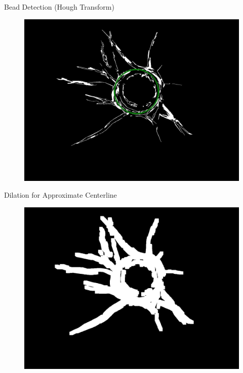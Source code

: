 \documentclass{beamer}
\begin{document}
\begin{frame}{Bead Detection (Hough Transform)}
	\begin{figure}
		\centering
		\includegraphics[width=\textwidth]{images/mono_found_circle}
	\end{figure}
\end{frame}

\begin{frame}{Dilation for Approximate Centerline}
	\begin{figure}
		\centering
		\includegraphics[width=\textwidth]{images/mono_dilated}
	\end{figure}
\end{frame}
\end{document}

